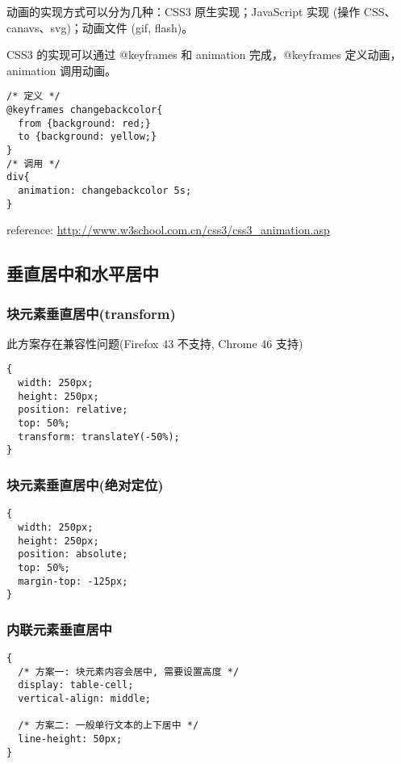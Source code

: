 动画的实现方式可以分为几种：CSS3 原生实现；JavaScript 实现 (操作
CSS、canavs、svg)；动画文件 (gif, flash)。

CSS3 的实现可以通过 @keyframes 和 animation 完成，@keyframes
定义动画，animation 调用动画。

\begin{lstlisting}
/* 定义 */
@keyframes changebackcolor{
  from {background: red;}
  to {background: yellow;}
}
/* 调用 */
div{
  animation: changebackcolor 5s;
}
\end{lstlisting}

reference: \url{http://www.w3school.com.cn/css3/css3_animation.asp}

\subsection{垂直居中和水平居中}\label{ux5782ux76f4ux5c45ux4e2dux548cux6c34ux5e73ux5c45ux4e2d}

\subsubsection{块元素垂直居中(transform)}\label{ux5757ux5143ux7d20ux5782ux76f4ux5c45ux4e2dtransform}

此方案存在兼容性问题(Firefox 43 不支持, Chrome 46 支持)

\begin{lstlisting}
{
  width: 250px;
  height: 250px;
  position: relative;
  top: 50%;
  transform: translateY(-50%);
}
\end{lstlisting}

\subsubsection{块元素垂直居中(绝对定位)}\label{ux5757ux5143ux7d20ux5782ux76f4ux5c45ux4e2dux7eddux5bf9ux5b9aux4f4d}

\begin{lstlisting}
{
  width: 250px;
  height: 250px;
  position: absolute;
  top: 50%;
  margin-top: -125px;
}
\end{lstlisting}

\subsubsection{内联元素垂直居中}\label{ux5185ux8054ux5143ux7d20ux5782ux76f4ux5c45ux4e2d}

\begin{lstlisting}
{
  /* 方案一: 块元素内容会居中, 需要设置高度 */
  display: table-cell;
  vertical-align: middle;

  /* 方案二: 一般单行文本的上下居中 */
  line-height: 50px;
}
\end{lstlisting}

